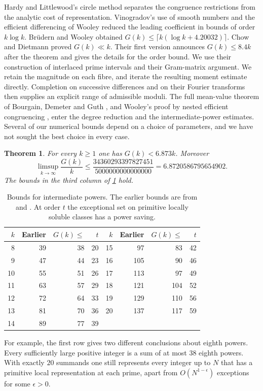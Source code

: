 \documentclass[11pt,letterpaper]{article}
\newtheorem{theorem}{Theorem}[section]
\theoremstyle{definition}
\begin{document}
Hardy and Littlewood's circle method separates the congruence restrictions
from the analytic cost of representation. Vinogradov's use of smooth
numbers and the efficient differencing of Wooley \cite{W92,W95} reduced
the leading coefficient in bounds of order $k\log k$. Br\"udern and
Wooley \cite{BW23} obtained $G(k)\le\lceil k(\log k+4.20032)\rceil$.
Chow and Dietmann \cite[Theorem 1.1]{CD} proved $G(k)\ll k$. Their
first version announces $G(k)\le8.4k$ after the theorem and gives the
details for the order bound. We use their construction of interlaced prime
intervals and their Gram-matrix argument. We retain the magnitude on each
fibre, and iterate the resulting moment estimate directly. Completion on
successive differences and on their Fourier transforms then supplies an
explicit range of admissible moduli.
The full mean-value theorem of Bourgain, Demeter and Guth \cite{BDG},
and Wooley's proof by nested efficient congruencing \cite{W19}, enter the
degree reduction and the intermediate-power estimates.
Several of our numerical bounds depend on a choice of parameters, and we
have not sought the best choice in every case.

\begin{theorem}\label{thm:main}
For every $k\ge1$ one has $G(k)<6.873k$. Moreover
\[
 \limsup_{k\to\infty}\frac{G(k)}k
 \le \frac{34360293397827451}{5000000000000000}
 =6.8720586795654902 .
\]
The bounds in the third column of \cref{tab:small} hold.
\end{theorem}
\begin{table}[ht]
\centering\small
\begin{tabular}{rrrr|rrrr}
\toprule
$k$&Earlier&$G(k)\le$&$t$&$k$&Earlier&$G(k)\le$&$t$\\
\midrule
8&39&38&20&15&97&83&42\\
9&47&44&23&16&105&90&46\\
10&55&51&26&17&113&97&49\\
11&63&57&29&18&121&104&52\\
12&72&64&33&19&129&110&56\\
13&81&70&36&20&137&117&59\\
14&89&77&39&&&&\\
\bottomrule
\end{tabular}
\caption{Bounds for intermediate powers. The earlier bounds are from
\cite[Theorem 1.1]{W16} and \cite[Theorem 1.3]{BW23}. At order $t$ the
exceptional set on primitive locally soluble classes has a power saving.}
\label{tab:small}
\end{table}
For example, the first row gives two different conclusions about eighth
powers. Every sufficiently large positive integer is a sum of at most
$38$ eighth powers. With exactly $20$ summands one still represents
every integer up to $N$ that has a primitive local representation at
each prime, apart from $O(N^{1-\epsilon})$ exceptions for some
$\epsilon>0$.
\end{document}
